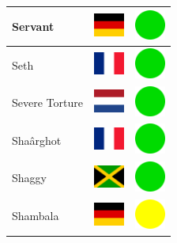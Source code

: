 \documentclass[12pt, a4paper, twoside]{report}
\begin{document}
\begin{center}
\begin{longtable}{|p{5cm}|p{2cm}|p{2cm}|}
 Servant                                                    & \includegraphics[width=1cm]{4x3/de} &   \includegraphics[width=1cm]{likes/y} \\ \hline
 Seth                                                       & \includegraphics[width=1cm]{4x3/fr} &   \includegraphics[width=1cm]{likes/y} \\ \hline
 Severe Torture                                             & \includegraphics[width=1cm]{4x3/nl} &   \includegraphics[width=1cm]{likes/y} \\ \hline
 Shaârghot                                                  & \includegraphics[width=1cm]{4x3/fr} &   \includegraphics[width=1cm]{likes/y} \\ \hline
 Shaggy                                                     & \includegraphics[width=1cm]{4x3/jm} &   \includegraphics[width=1cm]{likes/y} \\ \hline
 Shambala                                                   & \includegraphics[width=1cm]{4x3/de} &   \includegraphics[width=1cm]{likes/m} \\ \hline

\end{longtable}
\end{center}
\end{document}
